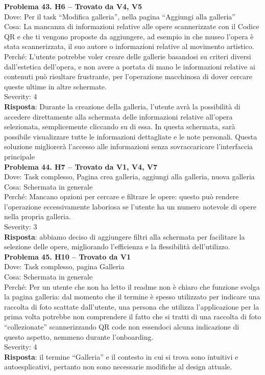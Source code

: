 \documentclass{article}
\begin{document}
\noindent \textbf{Problema 43. H6 – Trovato da V4, V5} \\
Dove: Per il task “Modifica galleria”, nella pagina “Aggiungi alla galleria” \\
Cosa: La mancanza di informazioni relative alle opere scannerizzate con il Codice QR e che ti vengono proposte da aggiungere, ad esempio in che museo l’opera è stata scannerizzata, il suo autore o informazioni relative al movimento artistico. \\
Perché: L’utente potrebbe voler creare delle gallerie basandosi su criteri diversi dall’estetica dell’opera, e non avere a portata di mano le informazioni relative ai contenuti può risultare frustrante, per l’operazione macchinosa di dover cercare queste ultime in altre schermate. \\
Severity: 4 \\
\textbf{Risposta}: Durante la creazione della galleria, l'utente avrà la possibilità di accedere direttamente alla schermata delle informazioni relative all'opera selezionata, semplicemente cliccando su di essa. In questa schermata, sarà possibile visualizzare tutte le informazioni dettagliate e le note personali. Questa soluzione migliorerà l’accesso alle informazioni senza sovraccaricare l’interfaccia principale\\

\noindent \textbf{Problema 44. H7 – Trovato da V1, V4, V7} \\
Dove: Task complesso, Pagina crea galleria, aggiungi alla galleria, nuova galleria \\
Cosa: Schermata in generale \\
Perché: Mancano opzioni per cercare e filtrare le opere: questo può rendere l’operazione eccessivamente laboriosa se l’utente ha un numero notevole di opere nella propria galleria. \\
Severity: 3 \\
\textbf{Risposta}: abbiamo deciso di aggiungere filtri alla schermata per facilitare la selezione delle opere, migliorando l’efficienza e la flessibilità dell’utilizzo.\\

\noindent \textbf{Problema 45. H10 – Trovato da V1} \\
Dove: Task complesso, pagina Galleria \\
Cosa: Schermata in generale \\
Perché: Per un utente che non ha letto il readme non è chiaro che funzione svolga la pagina galleria: dal momento che il termine è spesso utilizzato per indicare una raccolta di foto scattate dall’utente, una persona che utilizza l’applicazione per la prima volta potrebbe non comprendere il fatto che si tratti di una raccolta di foto “collezionate” scannerizzando QR code non essendoci alcuna indicazione di questo aspetto, nemmeno durante l’onboarding. \\
Severity: 4 \\
\textbf{Risposta}: il termine “Galleria” e il contesto in cui si trova sono intuitivi e autoesplicativi, pertanto non sono necessarie modifiche al design attuale.\\
\end{document}
